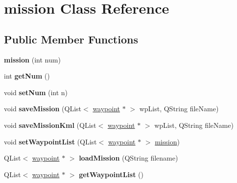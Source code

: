 \hypertarget{classmission}{\section{mission Class Reference}
\label{classmission}
}
\subsection*{Public Member Functions}
\begin{DoxyCompactItemize}
\item 
\hypertarget{classmission_aec5c8f2c77af3ed236361980e92d3201}{{\bfseries mission} (int num)}\label{classmission_aec5c8f2c77af3ed236361980e92d3201}

\item 
\hypertarget{classmission_a377ae9b9488fc87a56ebb78c032f7f12}{int {\bfseries get\-Num} ()}\label{classmission_a377ae9b9488fc87a56ebb78c032f7f12}

\item 
\hypertarget{classmission_ade6d52604371d07f740e214a95949d42}{void {\bfseries set\-Num} (int n)}\label{classmission_ade6d52604371d07f740e214a95949d42}

\item 
\hypertarget{classmission_a8286e699d07983fef640cb61ff68af61}{void {\bfseries save\-Mission} (Q\-List$<$ \hyperlink{classwaypoint}{waypoint} $\ast$ $>$ wp\-List, Q\-String file\-Name)}\label{classmission_a8286e699d07983fef640cb61ff68af61}

\item 
\hypertarget{classmission_aaaebab4b4ddfcc1ebdcc2264c14242a5}{void {\bfseries save\-Mission\-Kml} (Q\-List$<$ \hyperlink{classwaypoint}{waypoint} $\ast$ $>$ wp\-List, Q\-String file\-Name)}\label{classmission_aaaebab4b4ddfcc1ebdcc2264c14242a5}

\item 
\hypertarget{classmission_a14744faba87baa2eec6ba041e65ce8f1}{void {\bfseries set\-Waypoint\-List} (Q\-List$<$ \hyperlink{classwaypoint}{waypoint} $\ast$ $>$ \hyperlink{classmission}{mission})}\label{classmission_a14744faba87baa2eec6ba041e65ce8f1}

\item 
\hypertarget{classmission_a11a35f0e2c5ea898e44831574bd28236}{Q\-List$<$ \hyperlink{classwaypoint}{waypoint} $\ast$ $>$ {\bfseries load\-Mission} (Q\-String filename)}\label{classmission_a11a35f0e2c5ea898e44831574bd28236}

\item 
\hypertarget{classmission_a866d325348f5dfd10ac0f41ac5b086cb}{Q\-List$<$ \hyperlink{classwaypoint}{waypoint} $\ast$ $>$ {\bfseries get\-Waypoint\-List} ()}\label{classmission_a866d325348f5dfd10ac0f41ac5b086cb}

\end{DoxyCompactItemize}
